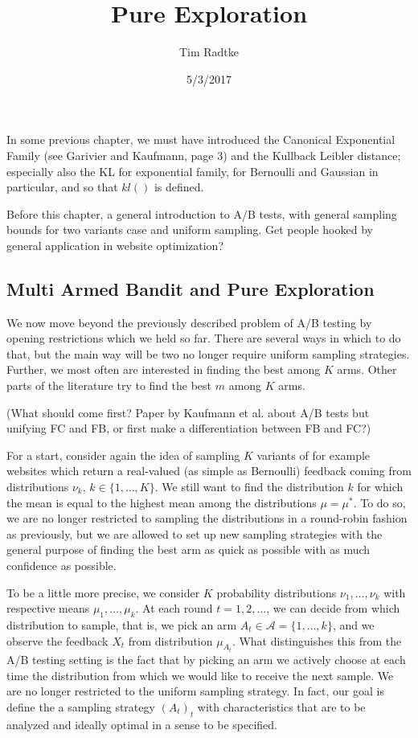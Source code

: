 \documentclass[12pt,]{article}
\title{Pure Exploration}
\author{Tim Radtke}
\date{5/3/2017}
\begin{document}
\maketitle

In some previous chapter, we must have introduced the Canonical
Exponential Family (see Garivier and Kaufmann, page 3) and the Kullback
Leibler distance; especially also the KL for exponential family, for
Bernoulli and Gaussian in particular, and so that \(kl()\) is defined.

Before this chapter, a general introduction to A/B tests, with general
sampling bounds for two variants case and uniform sampling. Get people
hooked by general application in website optimization?

\subsection{Multi Armed Bandit and Pure
Exploration}\label{multi-armed-bandit-and-pure-exploration}

\label{ch:MABandPureExploration}

We now move beyond the previously described problem of A/B testing by
opening restrictions which we held so far. There are several ways in
which to do that, but the main way will be two no longer require uniform
sampling strategies. Further, we most often are interested in finding
the best among \(K\) arms. Other parts of the literature try to find the
best \(m\) among \(K\) arms.

(What should come first? Paper by Kaufmann et al. about A/B tests but
unifying FC and FB, or first make a differentiation between FB and FC?)

For a start, consider again the idea of sampling \(K\) variants of for
example websites which return a real-valued (as simple as Bernoulli)
feedback coming from distributions \(\nu_k\), \(k \in \{1, \dots, K\}\).
We still want to find the distribution \(k\) for which the mean is equal
to the highest mean among the distributions \(\mu=\mu^*\). To do so, we
are no longer restricted to sampling the distributions in a round-robin
fashion as previously, but we are allowed to set up new sampling
strategies with the general purpose of finding the best arm as quick as
possible with as much confidence as possible.

To be a little more precise, we consider \(K\) probability distributions
\(\nu_1, \dots, \nu_k\) with respective means \(\mu_1, \dots, \mu_k\).
At each round \(t = 1, 2, \dots\), we can decide from which distribution
to sample, that is, we pick an arm
\(A_t \in \mathcal{A} = \{1, \dots, k\}\), and we observe the feedback
\(X_t\) from distribution \(\mu_{A_t}\). What distinguishes this from
the A/B testing setting is the fact that by picking an arm we actively
choose at each time the distribution from which we would like to receive
the next sample. We are no longer restricted to the uniform sampling
strategy. In fact, our goal is define the a sampling strategy
\((A_t)_t\) with characteristics that are to be analyzed and ideally
optimal in a sense to be specified.
\end{document}
